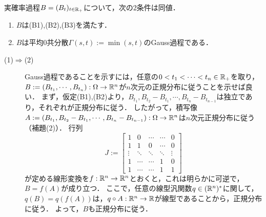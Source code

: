 \documentclass[uplatex,dvipdfmx]{jsreport}
\begin{document}
\begin{proposition}
    実確率過程$B=(B_t)_{t\in\mathbb{R}_+}$について，次の2条件は同値．
    \begin{enumerate}
        \item $B$は(B1),(B2),(B3)を満たす．
        \item $B$は平均$0$共分散$\Gamma(s,t):=\min(s,t)$のGauss過程である．
    \end{enumerate}
\end{proposition}
\begin{Proof}\mbox{}
    \begin{description}
        \item[(1)$\Rightarrow$(2)] Gauss過程であることを示すには，任意の$0<t_1<\cdots<t_n\in\mathbb{R}_+$を取り，$B:=(B_{t_1},\cdots,B_{t_n}):\Omega\to\mathbb{R}^n$が$n$次元の正規分布に従うことを示せば良い．
        まず，仮定(B1),(B2)より，$B_{t_1},B_{t_2}-B_{t_1},\cdots,B_{t_n}-B_{t_{n-1}}$は独立であり，それぞれが正規分布に従う．
        したがって，積写像$A:=(B_{t_1},B_{t_2}-B_{t_1},\cdots,B_{t_n}-B_{t_{n-1}}):\Omega\to\mathbb{R}^n$は$n$次元正規分布に従う（補題(2)）．
        行列
        \[J:=\begin{bmatrix}1&0&\cdots&\cdots&0\\1&1&0&\cdots&0\\\vdots&\ddots&\ddots&\ddots&\vdots\\1&\cdots&\cdots&1&0\\1&\cdots&\cdots&1&1\end{bmatrix}\]
        が定める線形変換を$f:\mathbb{R}^n\to\mathbb{R}^n$とおくと，これは明らかに可逆で，$B=f(A)$が成り立つ．
        ここで，任意の線型汎関数$q\in(\mathbb{R}^n)^*$に関して，$q(B)=q(f(A))$は，$q\circ A:\mathbb{R}^n\to\mathbb{R}$が線型であることから，正規分布に従う．
        よって，$B$も正規分布に従う．


\end{description}
\end{Proof}
\end{document}
